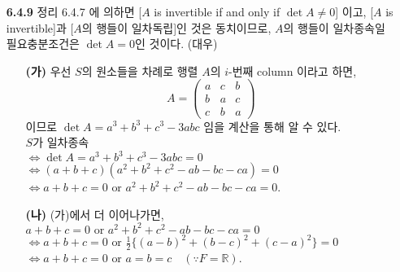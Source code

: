 \documentclass{article}
\begin{document}
\begin{itemize}
\item[\textbf{6.4.9}] 정리 6.4.7 에 의하면 [$A$ is invertible if and only if $\det{A} \neq 0$] 이고, [$A$ is invertible]과 [$A$의 행들이 일차독립]인 것은 동치이므로, $A$의 행들이 일차종속일 필요충분조건은 $\det{A} = 0$인 것이다. (대우)
	\begin{itemize}
		\item[\textbf{(가)}] 우선 $S$의 원소들을 차례로 행렬 $A$의 $i$-번째 column 이라고 하면,
			$$ A = 
			\begin{pmatrix}
				a & c & b \\
				b & a & c \\
				c & b & a
			\end{pmatrix} 
			$$ 이므로 $\det{A} = a^3+b^3+c^3-3abc$ 임을 계산을 통해 알 수 있다.\\
			$S$가 일차종속\\
			$\iff \det{A} = a^3+b^3+c^3-3abc = 0$ \\
			$\iff (a+b+c)(a^2+b^2+c^2-ab-bc-ca)=0$ \\
			$\iff a+b+c=0 \text{ or } a^2+b^2+c^2-ab-bc-ca=0$.
		\item[\textbf{(나)}] (가)에서 더 이어나가면,\\
			$a+b+c=0 \text{ or } a^2+b^2+c^2-ab-bc-ca=0$ \\
			$\iff a+b+c=0 \text{ or } \frac{1}{2}\{(a-b)^2+(b-c)^2+(c-a)^2\} = 0$ \\
			$\iff a+b+c=0 \text{ or } a=b=c \quad (\because F = \mathbb{R})$.
	\end{itemize}


\end{itemize}
\end{document}
